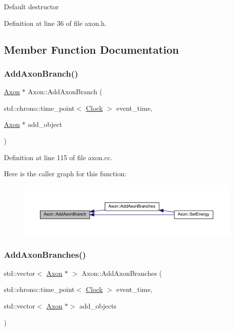 Default destructor 

Definition at line 36 of file axon.\+h.



\subsection{Member Function Documentation}
\mbox{\label{class_axon_a6ed85466115dab46ef71f26a420249ff}} 
\subsubsection{\texorpdfstring{Add\+Axon\+Branch()}{AddAxonBranch()}}
{\footnotesize\ttfamily \hyperlink{class_axon}{Axon} $\ast$ Axon\+::\+Add\+Axon\+Branch (\begin{DoxyParamCaption}\item[{std\+::chrono\+::time\+\_\+point$<$ \hyperlink{universe_8h_a0ef8d951d1ca5ab3cfaf7ab4c7a6fd80}{Clock} $>$}]{event\+\_\+time,  }\item[{\hyperlink{class_axon}{Axon} $\ast$}]{add\+\_\+object }\end{DoxyParamCaption})}



Definition at line 115 of file axon.\+cc.

Here is the caller graph for this function\+:\nopagebreak
\begin{figure}[H]
\begin{center}
\leavevmode
\includegraphics[width=350pt]{class_axon_a6ed85466115dab46ef71f26a420249ff_icgraph}
\end{center}
\end{figure}
\mbox{\label{class_axon_a04969d98c3fbb671cba5daccacffc003}} 
\subsubsection{\texorpdfstring{Add\+Axon\+Branches()}{AddAxonBranches()}}
{\footnotesize\ttfamily std\+::vector$<$ \hyperlink{class_axon}{Axon} $\ast$ $>$ Axon\+::\+Add\+Axon\+Branches (\begin{DoxyParamCaption}\item[{std\+::chrono\+::time\+\_\+point$<$ \hyperlink{universe_8h_a0ef8d951d1ca5ab3cfaf7ab4c7a6fd80}{Clock} $>$}]{event\+\_\+time,  }\item[{std\+::vector$<$ \hyperlink{class_axon}{Axon} $\ast$$>$}]{add\+\_\+objects }\end{DoxyParamCaption})}



